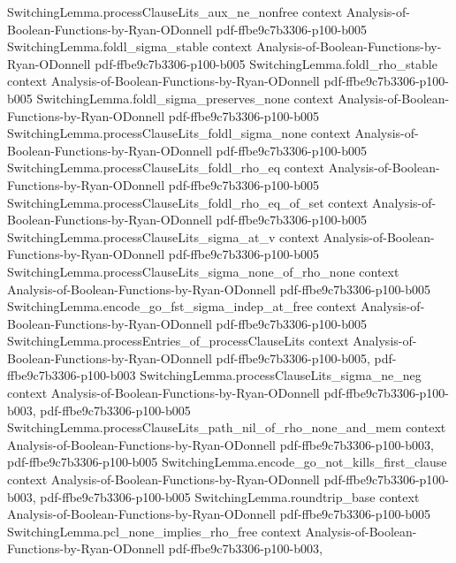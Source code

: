\begin{theorem}
\proofstep
  {SwitchingLemma.processClauseLits_aux_ne_nonfree}
  {context}
  {Analysis-of-Boolean-Functions-by-Ryan-ODonnell}
  {pdf-ffbe9c7b3306-p100-b005}
\proofstep
  {SwitchingLemma.foldl_sigma_stable}
  {context}
  {Analysis-of-Boolean-Functions-by-Ryan-ODonnell}
  {pdf-ffbe9c7b3306-p100-b005}
\proofstep
  {SwitchingLemma.foldl_rho_stable}
  {context}
  {Analysis-of-Boolean-Functions-by-Ryan-ODonnell}
  {pdf-ffbe9c7b3306-p100-b005}
\proofstep
  {SwitchingLemma.foldl_sigma_preserves_none}
  {context}
  {Analysis-of-Boolean-Functions-by-Ryan-ODonnell}
  {pdf-ffbe9c7b3306-p100-b005}
\proofstep
  {SwitchingLemma.processClauseLits_foldl_sigma_none}
  {context}
  {Analysis-of-Boolean-Functions-by-Ryan-ODonnell}
  {pdf-ffbe9c7b3306-p100-b005}
\proofstep
  {SwitchingLemma.processClauseLits_foldl_rho_eq}
  {context}
  {Analysis-of-Boolean-Functions-by-Ryan-ODonnell}
  {pdf-ffbe9c7b3306-p100-b005}
\proofstep
  {SwitchingLemma.processClauseLits_foldl_rho_eq_of_set}
  {context}
  {Analysis-of-Boolean-Functions-by-Ryan-ODonnell}
  {pdf-ffbe9c7b3306-p100-b005}
\proofstep
  {SwitchingLemma.processClauseLits_sigma_at_v}
  {context}
  {Analysis-of-Boolean-Functions-by-Ryan-ODonnell}
  {pdf-ffbe9c7b3306-p100-b005}
\proofstep
  {SwitchingLemma.processClauseLits_sigma_none_of_rho_none}
  {context}
  {Analysis-of-Boolean-Functions-by-Ryan-ODonnell}
  {pdf-ffbe9c7b3306-p100-b005}
\proofstep
  {SwitchingLemma.encode_go_fst_sigma_indep_at_free}
  {context}
  {Analysis-of-Boolean-Functions-by-Ryan-ODonnell}
  {pdf-ffbe9c7b3306-p100-b005}
\proofstep
  {SwitchingLemma.processEntries_of_processClauseLits}
  {context}
  {Analysis-of-Boolean-Functions-by-Ryan-ODonnell}
  {pdf-ffbe9c7b3306-p100-b005,
    pdf-ffbe9c7b3306-p100-b003}
\proofstep
  {SwitchingLemma.processClauseLits_sigma_ne_neg}
  {context}
  {Analysis-of-Boolean-Functions-by-Ryan-ODonnell}
  {pdf-ffbe9c7b3306-p100-b003,
    pdf-ffbe9c7b3306-p100-b005}
\proofstep
  {SwitchingLemma.processClauseLits_path_nil_of_rho_none_and_mem}
  {context}
  {Analysis-of-Boolean-Functions-by-Ryan-ODonnell}
  {pdf-ffbe9c7b3306-p100-b003,
    pdf-ffbe9c7b3306-p100-b005}
\proofstep
  {SwitchingLemma.encode_go_not_kills_first_clause}
  {context}
  {Analysis-of-Boolean-Functions-by-Ryan-ODonnell}
  {pdf-ffbe9c7b3306-p100-b003,
    pdf-ffbe9c7b3306-p100-b005}
\proofstep
  {SwitchingLemma.roundtrip_base}
  {context}
  {Analysis-of-Boolean-Functions-by-Ryan-ODonnell}
  {pdf-ffbe9c7b3306-p100-b005}
\proofstep
  {SwitchingLemma.pcl_none_implies_rho_free}
  {context}
  {Analysis-of-Boolean-Functions-by-Ryan-ODonnell}
  {pdf-ffbe9c7b3306-p100-b003,
}
\end{theorem}
